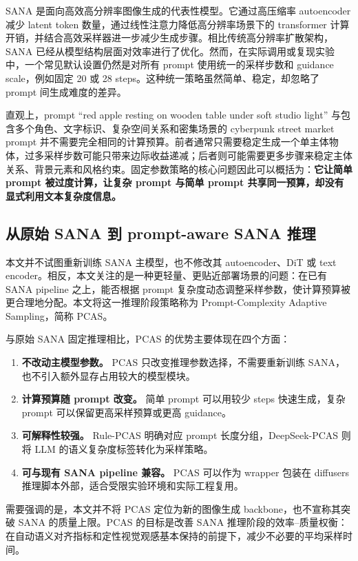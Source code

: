\documentclass[UTF8,zihao=-4,fontset=fandol]{ctexart}
\begin{document}
SANA 是面向高效高分辨率图像生成的代表性模型。它通过高压缩率 autoencoder 减少 latent token 数量，通过线性注意力降低高分辨率场景下的 transformer 计算开销，并结合高效采样器进一步减少生成步骤。相比传统高分辨率扩散架构，SANA 已经从模型结构层面对效率进行了优化。然而，在实际调用或复现实验中，一个常见默认设置仍然是对所有 prompt 使用统一的采样步数和 guidance scale，例如固定 20 或 28 steps。这种统一策略虽然简单、稳定，却忽略了 prompt 间生成难度的差异。

直观上，prompt ``red apple resting on wooden table under soft studio light'' 与包含多个角色、文字标识、复杂空间关系和密集场景的 cyberpunk street market prompt 并不需要完全相同的计算预算。前者通常只需要稳定生成一个单主体物体，过多采样步数可能只带来边际收益递减；后者则可能需要更多步骤来稳定主体关系、背景元素和风格约束。固定参数策略的核心问题因此可以概括为：\textbf{它让简单 prompt 被过度计算，让复杂 prompt 与简单 prompt 共享同一预算，却没有显式利用文本复杂度信息。}

\subsection{从原始 SANA 到 prompt-aware SANA 推理}

本文并不试图重新训练 SANA 主模型，也不修改其 autoencoder、DiT 或 text encoder。相反，本文关注的是一种更轻量、更贴近部署场景的问题：在已有 SANA pipeline 之上，能否根据 prompt 复杂度动态调整采样参数，使计算预算被更合理地分配。本文将这一推理阶段策略称为 Prompt-Complexity Adaptive Sampling，简称 PCAS。

与原始 SANA 固定推理相比，PCAS 的优势主要体现在四个方面：
\begin{enumerate}
  \item \textbf{不改动主模型参数。} PCAS 只改变推理参数选择，不需要重新训练 SANA，也不引入额外显存占用较大的模型模块。
  \item \textbf{计算预算随 prompt 改变。} 简单 prompt 可以用较少 steps 快速生成，复杂 prompt 可以保留更高采样预算或更高 guidance。
  \item \textbf{可解释性较强。} Rule-PCAS 明确对应 prompt 长度分组，DeepSeek-PCAS 则将 LLM 的语义复杂度标签转化为采样策略。
  \item \textbf{可与现有 SANA pipeline 兼容。} PCAS 可以作为 wrapper 包装在 diffusers 推理脚本外部，适合受限实验环境和实际工程复用。
\end{enumerate}

需要强调的是，本文并不将 PCAS 定位为新的图像生成 backbone，也不宣称其突破 SANA 的质量上限。PCAS 的目标是改善 SANA 推理阶段的效率--质量权衡：在自动语义对齐指标和定性视觉观感基本保持的前提下，减少不必要的平均采样时间。
\end{document}
